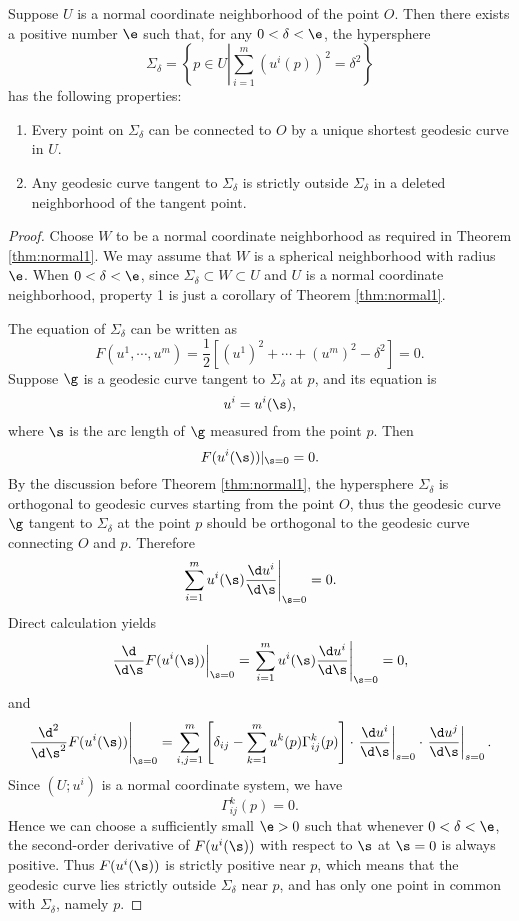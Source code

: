 \documentclass[11pt]{article}
\begin{document}
\begin{theorem}\label{thm:hypershpere}
    Suppose $U$ is a normal coordinate neighborhood of the point $O$. Then there exists a positive number $\e$ such that, for any $0 < \delta < \e$, the hypersphere $$\Sigma_\delta = \left\{p \in U \left\vert \sum_{i=1}^m (u^i(p))^2 = \delta^2 \right.\right\}$$ has the following properties:
    \begin{enumerate}
        \item Every point on $\Sigma_\delta$ can be connected to $O$ by a unique shortest geodesic curve in $U$.
        \item Any geodesic curve tangent to $\Sigma_\delta$ is strictly outside $\Sigma_\delta$ in a deleted neighborhood of the tangent point. 
    \end{enumerate}
\end{theorem}
\begin{proof}
    Choose $W$ to be a normal coordinate neighborhood as required in Theorem \ref{thm:normal1}. We may assume that $W$ is a spherical neighborhood with radius $\e$. When $0 < \delta < \e$, since $\Sigma_\delta \subset W \subset U$ and $U$ is a normal coordinate neighborhood, property 1 is just a corollary of Theorem \ref{thm:normal1}.

    The equation of $\Sigma_\delta$ can be written as $$F(u^1, \cdots, u^m) = \frac{1}{2}[(u^1)^2 + \cdots + (u^m)^2 - \delta^2] = 0.$$ Suppose $\g$ is a geodesic curve tangent to $\Sigma_\delta$ at $p$, and its equation is $$u^i = u^i(\s),$$ where $\s$ is the arc length of $\g$ measured from the point $p$. Then $$F(u^i(\s))|_{\s=0} = 0.$$ By the discussion before Theorem \ref{thm:normal1}, the hypersphere $\Sigma_\delta$ is orthogonal to geodesic curves starting from the point $O$, thus the geodesic curve $\g$ tangent to $\Sigma_\delta$ at the point $p$ should be orthogonal to the geodesic curve connecting $O$ and $p$. Therefore $$\left.\sum_{i=1}^m u^i(\s)\frac{\d u^i}{\d\s}\right|_{\s=0} = 0.$$ Direct calculation yields $$\left.\frac{\d}{\d\s} F(u^i(\s))\right|_{\s=0} = \left.\sum_{i=1}^m u^i(\s)\frac{\d u^i}{\d\s}\right|_{\s=0} = 0,$$ and $$\left.\frac{\d^2}{\d\s^2} F(u^i(\s))\right|_{\s=0} = \sum_{i,j=1}^m \left[\delta_{ij}-\sum_{k=1}^m u^k(p)\Gamma^k_{ij}(p)\right]\cdot\left.\frac{\d u^i}{\d\s}\right|_{s=0}\cdot\left.\frac{\d u^j}{\d\s}\right|_{s=0}.$$ Since $(U; u^i)$ is a normal coordinate system, we have $$\Gamma^k_{ij}(p) = 0.$$ Hence we can choose a sufficiently small $\e > 0$ such that whenever $0 < \delta < \e$, the second-order derivative of $F(u^i(\s))$ with respect to $\s$ at $\s = 0$ is always positive. Thus $F(u^i(\s))$ is strictly positive near $p$, which means that the geodesic curve lies strictly outside $\Sigma_\delta$ near $p$, and has only one point in common with $\Sigma_\delta$, namely $p$. 
\end{proof}
\end{document}
